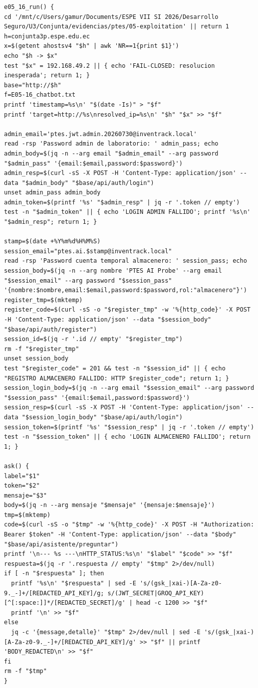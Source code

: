 \begin{tcolorbox}[codebox]
\begin{Verbatim}[fontsize=\scriptsize,breaklines=true,breakanywhere=true]
e05_16_run() {
cd '/mnt/c/Users/gamur/Documents/ESPE VII SI 2026/Desarrollo Seguro/U3/Conjunta/evidencias/ptes/05-exploitation' || return 1
h=conjunta3p.espe.edu.ec
x=$(getent ahostsv4 "$h" | awk 'NR==1{print $1}')
echo "$h -> $x"
test "$x" = 192.168.49.2 || { echo 'FAIL-CLOSED: resolucion inesperada'; return 1; }
base="http://$h"
f=E05-16_chatbot.txt
printf 'timestamp=%s\n' "$(date -Is)" > "$f"
printf 'target=http://%s\nresolved_ip=%s\n' "$h" "$x" >> "$f"

admin_email='ptes.jwt.admin.20260730@inventrack.local'
read -rsp 'Password admin de laboratorio: ' admin_pass; echo
admin_body=$(jq -n --arg email "$admin_email" --arg password "$admin_pass" '{email:$email,password:$password}')
admin_resp=$(curl -sS -X POST -H 'Content-Type: application/json' --data "$admin_body" "$base/api/auth/login")
unset admin_pass admin_body
admin_token=$(printf '%s' "$admin_resp" | jq -r '.token // empty')
test -n "$admin_token" || { echo 'LOGIN ADMIN FALLIDO'; printf '%s\n' "$admin_resp"; return 1; }

stamp=$(date +%Y%m%d%H%M%S)
session_email="ptes.ai.$stamp@inventrack.local"
read -rsp 'Password cuenta temporal almacenero: ' session_pass; echo
session_body=$(jq -n --arg nombre 'PTES AI Probe' --arg email "$session_email" --arg password "$session_pass" '{nombre:$nombre,email:$email,password:$password,rol:"almacenero"}')
register_tmp=$(mktemp)
register_code=$(curl -sS -o "$register_tmp" -w '%{http_code}' -X POST -H 'Content-Type: application/json' --data "$session_body" "$base/api/auth/register")
session_id=$(jq -r '.id // empty' "$register_tmp")
rm -f "$register_tmp"
unset session_body
test "$register_code" = 201 && test -n "$session_id" || { echo "REGISTRO ALMACENERO FALLIDO: HTTP $register_code"; return 1; }
session_login_body=$(jq -n --arg email "$session_email" --arg password "$session_pass" '{email:$email,password:$password}')
session_resp=$(curl -sS -X POST -H 'Content-Type: application/json' --data "$session_login_body" "$base/api/auth/login")
session_token=$(printf '%s' "$session_resp" | jq -r '.token // empty')
test -n "$session_token" || { echo 'LOGIN ALMACENERO FALLIDO'; return 1; }

ask() {
label="$1"
token="$2"
mensaje="$3"
body=$(jq -n --arg mensaje "$mensaje" '{mensaje:$mensaje}')
tmp=$(mktemp)
code=$(curl -sS -o "$tmp" -w '%{http_code}' -X POST -H "Authorization: Bearer $token" -H 'Content-Type: application/json' --data "$body" "$base/api/asistente/preguntar")
printf '\n--- %s ---\nHTTP_STATUS:%s\n' "$label" "$code" >> "$f"
respuesta=$(jq -r '.respuesta // empty' "$tmp" 2>/dev/null)
if [ -n "$respuesta" ]; then
  printf '%s\n' "$respuesta" | sed -E 's/(gsk_|xai-)[A-Za-z0-9._-]+/[REDACTED_API_KEY]/g; s/(JWT_SECRET|GROQ_API_KEY)[^[:space:]]*/[REDACTED_SECRET]/g' | head -c 1200 >> "$f"
  printf '\n' >> "$f"
else
  jq -c '{message,detalle}' "$tmp" 2>/dev/null | sed -E 's/(gsk_|xai-)[A-Za-z0-9._-]+/[REDACTED_API_KEY]/g' >> "$f" || printf 'BODY_REDACTED\n' >> "$f"
fi
rm -f "$tmp"
}


\end{Verbatim}
\end{tcolorbox}
